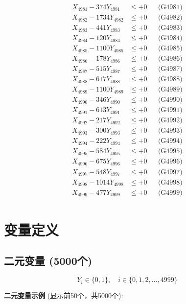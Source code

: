 \documentclass[a4paper,10pt]{article}
\begin{document}
{\begin{align}
\allowbreak
X_{4981} - 374Y_{4981} &\leq +0 && \text{(G4981)} \\
X_{4982} - 1734Y_{4982} &\leq +0 && \text{(G4982)} \\
X_{4983} - 441Y_{4983} &\leq +0 && \text{(G4983)} \\
X_{4984} - 120Y_{4984} &\leq +0 && \text{(G4984)} \\
X_{4985} - 1100Y_{4985} &\leq +0 && \text{(G4985)} \\
X_{4986} - 178Y_{4986} &\leq +0 && \text{(G4986)} \\
X_{4987} - 515Y_{4987} &\leq +0 && \text{(G4987)} \\
X_{4988} - 617Y_{4988} &\leq +0 && \text{(G4988)} \\
X_{4989} - 1100Y_{4989} &\leq +0 && \text{(G4989)} \\
X_{4990} - 346Y_{4990} &\leq +0 && \text{(G4990)} \\
\allowbreak
X_{4991} - 613Y_{4991} &\leq +0 && \text{(G4991)} \\
X_{4992} - 217Y_{4992} &\leq +0 && \text{(G4992)} \\
X_{4993} - 300Y_{4993} &\leq +0 && \text{(G4993)} \\
X_{4994} - 222Y_{4994} &\leq +0 && \text{(G4994)} \\
X_{4995} - 584Y_{4995} &\leq +0 && \text{(G4995)} \\
X_{4996} - 675Y_{4996} &\leq +0 && \text{(G4996)} \\
X_{4997} - 548Y_{4997} &\leq +0 && \text{(G4997)} \\
X_{4998} - 1014Y_{4998} &\leq +0 && \text{(G4998)} \\
X_{4999} - 477Y_{4999} &\leq +0 && \text{(G4999)} \\
\end{align}
}

\section{变量定义}

\subsection{二元变量 (5000个)}

\begin{equation}
Y_i \in \{0,1\}, \quad i \in \{0, 1, 2, \ldots, 4999\}
\end{equation}

\textbf{二元变量示例} (显示前50个，共5000个):
\end{document}
